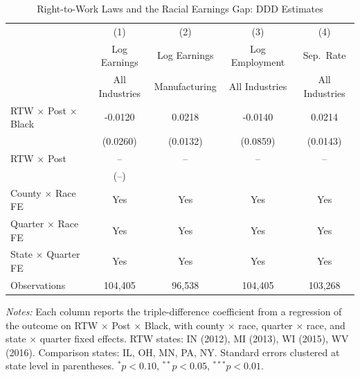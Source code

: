 \begin{table}[htbp]
\centering
\caption{Right-to-Work Laws and the Racial Earnings Gap: DDD Estimates}
\label{tab:main}
\begin{threeparttable}
\small
\begin{tabular}{lcccc}
\toprule
 & (1) & (2) & (3) & (4) \\
 & Log Earnings & Log Earnings & Log Employment & Sep.~Rate \\
 & All Industries & Manufacturing & All Industries & All Industries \\
\midrule
RTW $\times$ Post $\times$ Black & -0.0120 & 0.0218 & -0.0140 & 0.0214 \\
 & (0.0260) & (0.0132) & (0.0859) & (0.0143) \\
RTW $\times$ Post & -- & -- & -- & -- \\
 & (--) & & & \\
\midrule
County $\times$ Race FE & Yes & Yes & Yes & Yes \\
Quarter $\times$ Race FE & Yes & Yes & Yes & Yes \\
State $\times$ Quarter FE & Yes & Yes & Yes & Yes \\
Observations & 104,405 & 96,538 & 104,405 & 103,268 \\
\bottomrule
\end{tabular}
\begin{tablenotes}[flushleft]\footnotesize\sloppy
\item \textit{Notes:} Each column reports the triple-difference coefficient from a regression of the outcome on RTW $\times$ Post $\times$ Black, with county $\times$ race, quarter $\times$ race, and state $\times$ quarter fixed effects. RTW states: IN (2012), MI (2013), WI (2015), WV (2016). Comparison states: IL, OH, MN, PA, NY. Standard errors clustered at state level in parentheses. $^{*}p<0.10$, $^{**}p<0.05$, $^{***}p<0.01$.
\end{tablenotes}
\end{threeparttable}
\end{table}

